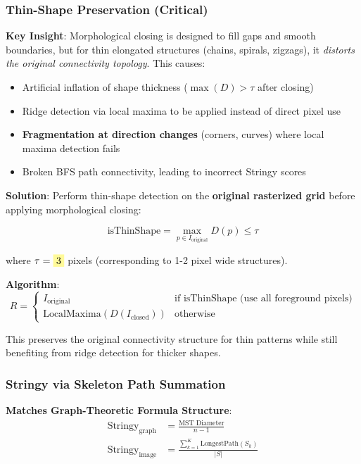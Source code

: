 \documentclass[11pt]{article}
\newcommand{\param}[1]{\colorbox{yellow!40}{$#1$}}
\begin{document}
\subsubsection{Thin-Shape Preservation (Critical)}

\textbf{Key Insight}: Morphological closing is designed to fill gaps and smooth boundaries, but for thin elongated structures (chains, spirals, zigzags), it \textit{distorts the original connectivity topology}. This causes:
\begin{itemize}
    \item Artificial inflation of shape thickness ($\max(D) > \tau$ after closing)
    \item Ridge detection via local maxima to be applied instead of direct pixel use
    \item \textbf{Fragmentation at direction changes} (corners, curves) where local maxima detection fails
    \item Broken BFS path connectivity, leading to incorrect Stringy scores
\end{itemize}

\textbf{Solution}: Perform thin-shape detection on the \textbf{original rasterized grid} before applying morphological closing:

\begin{equation}
    \text{isThinShape} = \max_{p \in I_{\text{original}}} D(p) \leq \tau
\end{equation}

where $\tau = \param{3}$ pixels (corresponding to 1-2 pixel wide structures).

\textbf{Algorithm}:
\begin{equation}
    R = \begin{cases}
        I_{\text{original}} & \text{if isThinShape (use all foreground pixels)} \\
        \text{LocalMaxima}(D(I_{\text{closed}})) & \text{otherwise}
    \end{cases}
\end{equation}

This preserves the original connectivity structure for thin patterns while still benefiting from ridge detection for thicker shapes.

\subsubsection{Stringy via Skeleton Path Summation}

\textbf{Matches Graph-Theoretic Formula Structure}:
\begin{align}
    \text{Stringy}_{\text{graph}} &= \frac{\text{MST Diameter}}{n - 1} \\
    \text{Stringy}_{\text{image}} &= \frac{\sum_{k=1}^{K} \text{LongestPath}(S_k)}{|S|}
\end{align}
\end{document}
